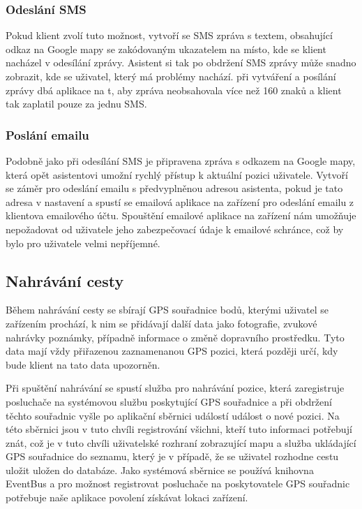 \documentclass[czech,master,public,dept460,male,java,cpdeclaration]{diploma}
\begin{document}
\subsubsection{Odeslání SMS}
Pokud klient zvolí tuto možnost, vytvoří se SMS zpráva s textem, obsahující odkaz na Google mapy
se zakódovaným ukazatelem na místo, kde se klient nacházel v odesílání zprávy. Asistent si tak po obdržení
SMS zprávy může snadno zobrazit, kde se uživatel, který má problémy nachází. při vytváření a posílání zprávy
dbá aplikace na t, aby zpráva neobsahovala více než 160 znaků a klient tak zaplatil pouze za jednu SMS.

\subsubsection{Poslání emailu}
Podobně jako při odesílání SMS je připravena zpráva s odkazem na Google mapy, která opět asistentovi
umožní rychlý přístup k aktuální pozici uživatele. Vytvoří se záměr pro odeslání emailu s předvyplněnou
adresou asistenta, pokud je tato adresa v nastavení a spustí se emailová aplikace na zařízení pro odeslání
emailu z klientova emailového účtu. Spouštění emailové aplikace na zařízení nám umožňuje nepožadovat
od uživatele jeho zabezpečovací údaje k emailové schránce, což by bylo pro uživatele velmi nepříjemné.



\subsection{Nahrávání cesty}
Během nahrávání cesty se sbírají GPS souřadnice bodů, kterými uživatel se zařízením prochází,
k nim se přidávají další data jako fotografie, zvukové nahrávky poznámky,
případně informace o změně dopravního prostředku. Tyto data mají vždy přiřazenou zaznamenanou
GPS pozici, která později určí, kdy bude klient na tato data upozorněn.

Při spuštění nahrávání se spustí služba pro nahrávání pozice, která zaregistruje
posluchače na systémovou službu poskytující GPS souřadnice a při obdržení těchto souřadnic
vyšle po aplikační sběrnici událostí událost o nové pozici. Na této sběrnici jsou v tuto chvíli
registrování všichni, kteří tuto informaci potřebují znát, což je v tuto chvíli uživatelské rozhraní
zobrazující mapu a služba ukládající GPS souřadnice do seznamu, který je v případě, že se uživatel
rozhodne cestu uložit uložen do databáze. Jako systémová sběrnice se používá knihovna EventBus a pro
možnost registrovat posluchače na poskytovatele GPS souřadnic potřebuje naše aplikace povolení
získávat lokaci zařízení.
\end{document}
